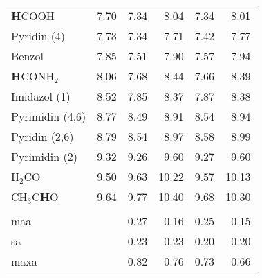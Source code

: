 \begin{table}[ht!]
{\begin{tabular}{lr|rr|rr}
    \textbf{H}COOH & 7.70   & 7.34  & 8.04  & 7.34  & 8.01 \\
    Pyridin (4) & 7.73  & 7.34  & 7.71  & 7.42  & 7.77 \\
    Benzol & 7.85  & 7.51  & 7.90   & 7.57  & 7.94 \\
    \textbf{H}CONH$_{2}$ & 8.06  & 7.68  & 8.44  & 7.66  & 8.39 \\
    Imidazol (1) & 8.52  & 7.85  & 8.37  & 7.87  & 8.38 \\
    Pyrimidin (4,6) & 8.77  & 8.49  & 8.91  & 8.54  & 8.94 \\
    Pyridin (2,6) & 8.79  & 8.54  & 8.97  & 8.58  & 8.99 \\
    Pyrimidin (2) & 9.32  & 9.26  & 9.60   & 9.27  & 9.60 \\
    H$_{2}$CO  & 9.50   & 9.63  & 10.22 & 9.57  & 10.13 \\
    CH$_{3}$C\textbf{H}O & 9.64  & 9.77  & 10.40  & 9.68  & 10.30 \\
          &       &       &       &       &  \\
    \ac{maa}   &       & 0.27  & 0.16  & 0.25  & 0.15 \\
    \ac{sa}  &       & 0.23  & 0.23  & 0.20   & 0.20 \\
    \ac{maxa}  &       & 0.82  & 0.76  & 0.73  & 0.66 \\
    \end{tabular}}%
  \label{tab:1hshifts}%
\end{table}%
\FloatBarrier
\vfill
\newpage
